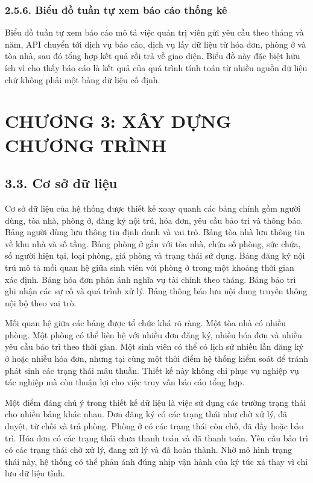 \documentclass[12pt]{article}
\begin{document}
\subsubsection*{2.5.6. Biểu đồ tuần tự xem báo cáo thống kê}

Biểu đồ tuần tự xem báo cáo mô tả việc quản trị viên gửi yêu cầu theo tháng và năm, API chuyển tới dịch vụ báo cáo, dịch vụ lấy dữ liệu từ hóa đơn, phòng ở và tòa nhà, sau đó tổng hợp kết quả rồi trả về giao diện. Biểu đồ này đặc biệt hữu ích vì cho thấy báo cáo là kết quả của quá trình tính toán từ nhiều nguồn dữ liệu chứ không phải một bảng dữ liệu cố định.

\newpage
\section*{CHƯƠNG 3: XÂY DỰNG CHƯƠNG TRÌNH}

\subsection*{3.3. Cơ sở dữ liệu}

Cơ sở dữ liệu của hệ thống được thiết kế xoay quanh các bảng chính gồm người dùng, tòa nhà, phòng ở, đăng ký nội trú, hóa đơn, yêu cầu bảo trì và thông báo. Bảng người dùng lưu thông tin định danh và vai trò. Bảng tòa nhà lưu thông tin về khu nhà và số tầng. Bảng phòng ở gắn với tòa nhà, chứa số phòng, sức chứa, số người hiện tại, loại phòng, giá phòng và trạng thái sử dụng. Bảng đăng ký nội trú mô tả mối quan hệ giữa sinh viên với phòng ở trong một khoảng thời gian xác định. Bảng hóa đơn phản ánh nghĩa vụ tài chính theo tháng. Bảng bảo trì ghi nhận các sự cố và quá trình xử lý. Bảng thông báo lưu nội dung truyền thông nội bộ theo vai trò.

Mối quan hệ giữa các bảng được tổ chức khá rõ ràng. Một tòa nhà có nhiều phòng. Một phòng có thể liên hệ với nhiều đơn đăng ký, nhiều hóa đơn và nhiều yêu cầu bảo trì theo thời gian. Một sinh viên có thể có lịch sử nhiều lần đăng ký ở hoặc nhiều hóa đơn, nhưng tại cùng một thời điểm hệ thống kiểm soát để tránh phát sinh các trạng thái mâu thuẫn. Thiết kế này không chỉ phục vụ nghiệp vụ tác nghiệp mà còn thuận lợi cho việc truy vấn báo cáo tổng hợp.

Một điểm đáng chú ý trong thiết kế dữ liệu là việc sử dụng các trường trạng thái cho nhiều bảng khác nhau. Đơn đăng ký có các trạng thái như chờ xử lý, đã duyệt, từ chối và trả phòng. Phòng ở có các trạng thái còn chỗ, đã đầy hoặc bảo trì. Hóa đơn có các trạng thái chưa thanh toán và đã thanh toán. Yêu cầu bảo trì có các trạng thái chờ xử lý, đang xử lý và đã hoàn thành. Nhờ mô hình trạng thái này, hệ thống có thể phản ánh đúng nhịp vận hành của ký túc xá thay vì chỉ lưu dữ liệu tĩnh.
\end{document}

